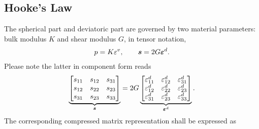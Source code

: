 \subsection{Hooke's Law}
The spherical part and deviatoric part are governed by two material parameters: bulk modulus $K$ and shear modulus $G$, in tensor notation,
\begin{gather}
p=K\varepsilon^v,\qquad\bm{s}=2G\bm{\varepsilon}^d.
\end{gather}
Please note the latter in component form reads
\begin{gather}
\underbrace{\begin{bmatrix}
s_{11}&s_{12}&s_{31}\\
s_{12}&s_{22}&s_{23}\\
s_{31}&s_{23}&s_{33}
\end{bmatrix}}_{\bm{s}}
=
2G
\underbrace{\begin{bmatrix}
\varepsilon^d_{11}&\varepsilon^d_{12}&\varepsilon^d_{31}\\
\varepsilon^d_{12}&\varepsilon^d_{22}&\varepsilon^d_{23}\\
\varepsilon^d_{31}&\varepsilon^d_{23}&\varepsilon^d_{33}
\end{bmatrix}}_{\bm{\varepsilon}^d}.
\end{gather}
The corresponding compressed matrix representation shall be expressed as
